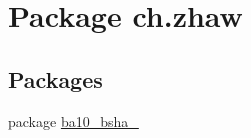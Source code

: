 \hypertarget{namespacech_1_1zhaw}{
\section{Package ch.zhaw}
\label{namespacech_1_1zhaw}
}
\subsection*{Packages}
\begin{DoxyCompactItemize}
\item 
package \hyperlink{namespacech_1_1zhaw_1_1ba10__bsha__1}{ba10\_\-bsha\_}
\end{DoxyCompactItemize}

